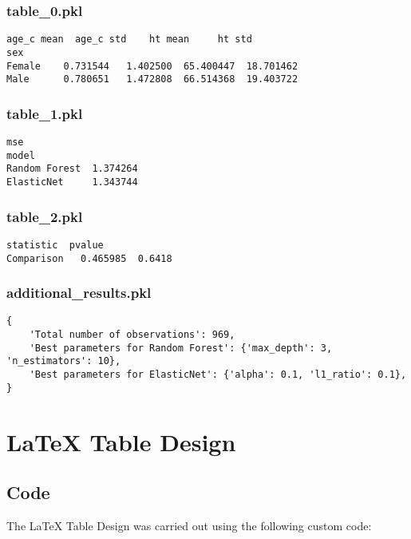 \documentclass[11pt]{article}
\begin{document}
\subsubsection*{table\_0.pkl}

\begin{Verbatim}[tabsize=4]
        age_c mean  age_c std    ht mean     ht std
sex
Female    0.731544   1.402500  65.400447  18.701462
Male      0.780651   1.472808  66.514368  19.403722
\end{Verbatim}

\subsubsection*{table\_1.pkl}

\begin{Verbatim}[tabsize=4]
                    mse
model
Random Forest  1.374264
ElasticNet     1.343744
\end{Verbatim}

\subsubsection*{table\_2.pkl}

\begin{Verbatim}[tabsize=4]
            statistic  pvalue
Comparison   0.465985  0.6418
\end{Verbatim}

\subsubsection*{additional\_results.pkl}

\begin{Verbatim}[tabsize=4]
{
    'Total number of observations': 969,
    'Best parameters for Random Forest': {'max_depth': 3, 'n_estimators': 10},
    'Best parameters for ElasticNet': {'alpha': 0.1, 'l1_ratio': 0.1},
}
\end{Verbatim}

\section{LaTeX Table Design}
\subsection{{Code}}
The LaTeX Table Design was carried out using the following custom code:
\end{document}
